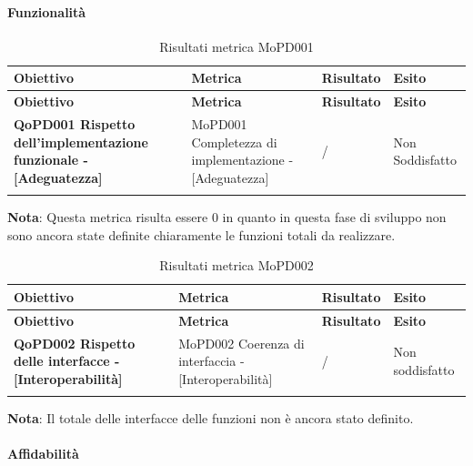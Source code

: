 \documentclass[../piano-di-qualifica.tex]{subfiles}
\begin{document}
\paragraph{Funzionalità}
\label{sub:funzionalita}

\renewcommand{\arraystretch}{2} %
\begin{longtable}[H]{>{\centering\bfseries}m{5cm} >{\centering}m{5cm} >{\centering}m{2.5cm} >{\centering\arraybackslash}m{2.5cm}}  
  \rowcolor{lightgray}
  {\textbf{Obiettivo}} & {\textbf{Metrica}} & {\textbf{Risultato}} & {\textbf{Esito}}  \\
  \endfirsthead%
  \rowcolor{lightgray}
  {\textbf{Obiettivo}} & {\textbf{Metrica}} & {\textbf{Risultato}} & {\textbf{Esito}}  \\
  \endhead%
  \textbf{QoPD001 Rispetto dell’implementazione funzionale - [Adeguatezza]} & MoPD001 Completezza di implementazione - [Adeguatezza] & / & Non Soddisfatto \\
  \caption{Risultati metrica MoPD001}
  \label{tab:my-table}
\end{longtable}
\textbf{Nota}: Questa metrica risulta essere 0 in quanto in questa fase di sviluppo non sono ancora state definite chiaramente le funzioni totali da realizzare.

\renewcommand{\arraystretch}{2} %
\begin{longtable}[H]{>{\centering\bfseries}m{5cm} >{\centering}m{5cm} >{\centering}m{2.5cm} >{\centering\arraybackslash}m{2.5cm}}  
  \rowcolor{lightgray}
  {\textbf{Obiettivo}} & {\textbf{Metrica}} & {\textbf{Risultato}} & {\textbf{Esito}}  \\
  \endfirsthead%
  \rowcolor{lightgray}
  {\textbf{Obiettivo}} & {\textbf{Metrica}} & {\textbf{Risultato}} & {\textbf{Esito}}  \\
  \endhead%
  \textbf{QoPD002 Rispetto delle interfacce - [Interoperabilità]} & MoPD002 Coerenza di interfaccia - [Interoperabilità] & / & Non soddisfatto \\
  \caption{Risultati metrica MoPD002}
  \label{tab:my-table}
\end{longtable}
\textbf{Nota}: Il totale delle interfacce delle funzioni non è ancora stato definito.

\paragraph{Affidabilità}
\label{sub:affidabilita}
\end{document}
